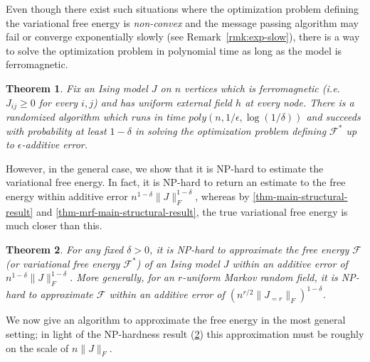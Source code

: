 \documentclass[final, 12pt]{colt2018}
\newtheorem{theorem}{Theorem}[section]
\theoremstyle{definition}
\newtheorem{remark}[theorem]{Remark}
\theoremstyle{plain}
\begin{document}
Even though there exist such situations where the optimization problem
defining the variational free energy is \emph{non-convex} and the message passing algorithm may fail or converge exponentially slowly (see Remark~\ref{rmk:exp-slow}),
there is a way to solve the optimization problem in polynomial time as long
as the model is ferromagnetic.
\begin{theorem}\label{thm:ferromagnetic-algorithm}
Fix an Ising model $J$ %
on $n$ vertices which is 
ferromagnetic (i.e. $J_{ij} \ge 0$ for every $i,j$) and has uniform external field $h$ at every node.
There is a randomized algorithm which runs in time $poly(n,1/\epsilon,\log(1/\delta))$ and succeeds with probability at least $1 - \delta$ in solving the optimization problem defining $\mathcal{F}^*$ up to $\epsilon$-additive error.
\end{theorem}
However, in the general case, we show that it is NP-hard to estimate
the variational free energy. In fact,
it is NP-hard to return an estimate to the 
free energy within additive error $n^{1 - \delta} \|J\|_F^{1 - \delta}$, 
whereas by \cref{thm-main-structural-result} and \cref{thm-mrf-main-structural-result}, the true variational free energy is much closer than this. %
\begin{theorem}\label{thm:free-energy-hardness}
For any fixed $\delta > 0$, it is NP-hard to approximate the free energy
$\mathcal{F}$ (or variational free energy $\mathcal{F}^*$) of an Ising model $J$ within an additive error of $n^{1 - \delta} \|J\|_F^{1 - \delta}$. More generally, for
an $r$-uniform Markov random field, it is NP-hard to approximate $\mathcal{F}$ within
an additive error of $(n^{r/2} \|J_{=r}\|_F)^{1 - \delta}$.
\end{theorem}
We now give an algorithm to approximate
the free energy in the most general setting;
in light of the NP-hardness result (\cref{thm:free-energy-hardness})
this approximation must be roughly on the scale of $n \|J\|_F$.
\end{document}
